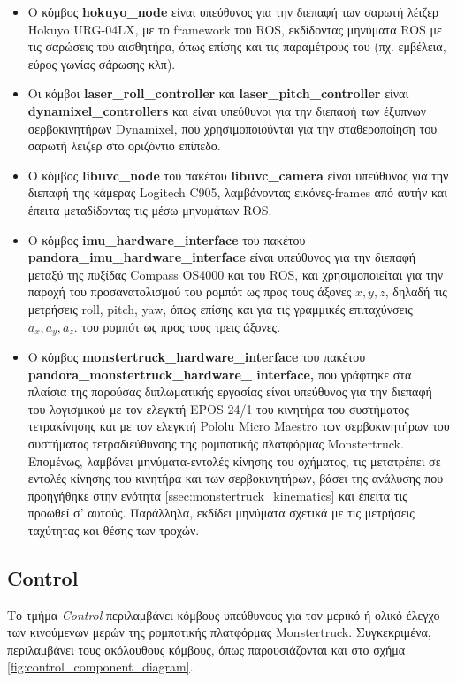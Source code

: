 \begin{itemize}
	\item Ο κόμβος \textbf{hokuyo{\_}node} \cite{hokuyo_node}  είναι υπεύθυνος για την διεπαφή των σαρωτή λέιζερ Hokuyo URG-04LX, με το framework του ROS, εκδίδοντας μηνύματα ROS με τις σαρώσεις του αισθητήρα, όπως επίσης και τις παραμέτρους του (πχ. εμβέλεια, εύρος γωνίας σάρωσης κλπ).
	\item Οι κόμβοι \textbf{laser{\_}roll{\_}controller} και \textbf{laser{\_}pitch{\_}controller} είναι \textbf{dynamixel{\_}controllers}  \cite{dynamixel_controllers} και είναι υπεύθυνοι για την διεπαφή των έξυπνων σερβοκινητήρων Dynamixel, που χρησιμοποιούνται για την σταθεροποίηση του σαρωτή λέιζερ στο οριζόντιο επίπεδο.
	\item Ο κόμβος \textbf{libuvc{\_}node} του πακέτου \textbf{libuvc{\_}camera} \cite{libuvc} είναι υπεύθυνος για την διεπαφή της κάμερας Logitech C905, λαμβάνοντας εικόνες-frames από αυτήν και έπειτα μεταδίδοντας τις μέσω μηνυμάτων ROS.
	\item Ο κόμβος \textbf{imu{\_}hardware{\_}interface} του πακέτου \textbf{pandora{\_}imu{\_}hardware{\_}interface} είναι υπεύθυνος για την διεπαφή μεταξύ της πυξίδας Compass OS4000 και του ROS, και χρησιμοποιείται για την παροχή του προσανατολισμού του ρομπότ ως προς τους άξονες $x,y,z$, δηλαδή τις μετρήσεις roll, pitch, yaw, όπως επίσης και για τις γραμμικές επιταχύνσεις $a_x,a_y,a_z$. του ρομπότ ως προς τους τρεις άξονες.
	\item Ο κόμβος \textbf{monstertruck{\_}hardware{\_}interface} του πακέτου \textbf{pandora{\_}monstertruck{\_}hardware{\_} interface,} που γράφτηκε στα πλαίσια της παρούσας διπλωματικής εργασίας είναι υπεύθυνος για την διεπαφή του λογισμικού με τον ελεγκτή EPOS 24/1 του κινητήρα του συστήματος τετρακίνησης και με τον ελεγκτή Pololu Micro Maestro των σερβοκινητήρων του συστήματος τετραδιεύθυνσης της ρομποτικής πλατφόρμας Monstertruck. Επομένως, λαμβάνει μηνύματα-εντολές κίνησης του οχήματος, τις μετατρέπει σε εντολές κίνησης του κινητήρα και των σερβοκινητήρων, βάσει της ανάλυσης που προηγήθηκε στην ενότητα \ref{ssec:monstertruck_kinematics} και έπειτα τις προωθεί σ' αυτούς. Παράλληλα, εκδίδει μηνύματα σχετικά με τις μετρήσεις ταχύτητας και θέσης των τροχών.
\end{itemize}

\subsection{Control} \label{ssec:control_component}
Το τμήμα \textit{Control} περιλαμβάνει κόμβους υπεύθυνους για τον μερικό ή ολικό έλεγχο των κινούμενων μερών της ρομποτικής πλατφόρμας Monstertruck. Συγκεκριμένα, περιλαμβάνει τους ακόλουθους κόμβους, όπως παρουσιάζονται και στο σχήμα \ref{fig:control_component_diagram}.

